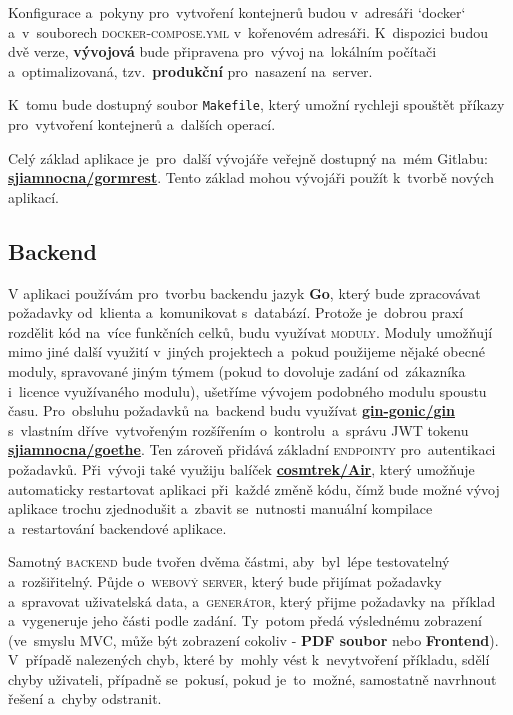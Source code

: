 \documentclass[14pt,a4paper]{article}
\begin{document}
        Konfigurace a~pokyny pro~vytvoření kontejnerů budou v~adresáři `docker` a~v~souborech \textsc{docker-compose.yml} v~kořenovém adresáři. K~dispozici budou dvě verze, \textbf{vývojová} bude připravena pro~vývoj na~lokálním počítači a~optimalizovaná, tzv.~\textbf{produkční} pro~nasazení na~server.

        K~tomu bude dostupný soubor \texttt{Makefile}, který umožní rychleji spouštět příkazy pro~vytvoření kontejnerů a~dalších operací.

        Celý základ aplikace je~pro~další vývojáře veřejně dostupný na~mém Gitlabu: \href{https://gitlab.com/sjiamnocna/gormrest}{\textbf{sjiamnocna/gormrest}}. Tento základ mohou vývojáři použít k~tvorbě nových aplikací.
        
        \subsection{Backend}
            V aplikaci používám pro~tvorbu backendu jazyk \textbf{Go}, který bude zpracovávat požadavky od~klienta a~komunikovat s~databází.
            Protože je~dobrou praxí rozdělit kód na~více funkčních celků, budu využívat \textsc{moduly}. Moduly umožňují mimo jiné další využití v~jiných projektech a~pokud použijeme nějaké obecné moduly, spravované jiným týmem (pokud to dovoluje zadání od~zákazníka i~licence využívaného modulu), ušetříme vývojem podobného modulu spoustu času. \parencite{Zimmerman2023:howtowritebetter}
            Pro~obsluhu požadavků na~backend budu využívat \href{https://github.com/gin-gonic/gin}{\textbf{gin-gonic/gin}} s~vlastním dříve~vytvořeným rozšířením o~kontrolu~a~správu \textsc{JWT} tokenu \href{https://gitlab.com/sjiamnocna/goethe}{\textbf{sjiamnocna/goethe}}. Ten zároveň přidává základní \textsc{endpointy} pro~autentikaci požadavků.
            Při~vývoji také využiju balíček \href{https://github.com/cosmtrek/air}{\textbf{cosmtrek/Air}}, který umožňuje automaticky restartovat aplikaci při~každé změně kódu, čímž bude možné vývoj aplikace trochu zjednodušit a~zbavit se~nutnosti manuální kompilace a~restartování backendové aplikace.

            Samotný \textsc{backend} bude tvořen dvěma částmi, aby~byl~lépe testovatelný a~rozšiřitelný. Půjde o~\textsc{webový server}, který bude přijímat požadavky a~spravovat uživatelská data, a~\textsc{generátor}, který přijme požadavky na~příklad a~vygeneruje jeho části podle zadání. Ty~potom předá výslednému zobrazení (ve~smyslu \textsc{MVC}, může být zobrazení cokoliv - \textbf{PDF soubor} nebo \textbf{Frontend}). V~případě nalezených chyb, které by~mohly vést k~nevytvoření příkladu, sdělí chyby uživateli, případně se~pokusí, pokud je~to~možné, samostatně navrhnout řešení a~chyby odstranit.
            
\end{document}
